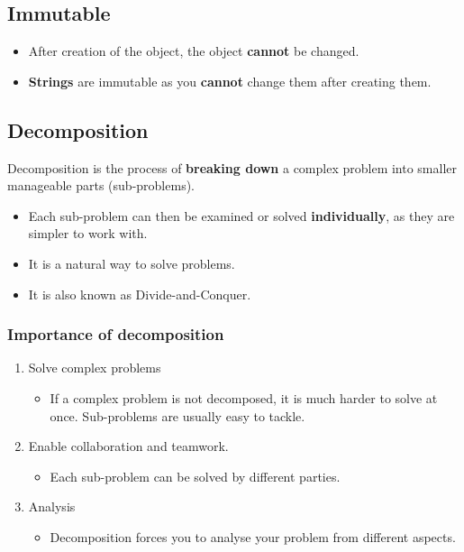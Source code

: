 \documentclass[11pt]{article}
\begin{document}
\subsection{Immutable}
\label{sec:orgfdb2670}
\begin{itemize}
\item After creation of the object, the object \textbf{cannot} be changed.
\item \textbf{Strings} are immutable as you \textbf{cannot} change them after creating them.
\end{itemize}

\subsection{Decomposition}
\label{sec:orgf41490e}
Decomposition is the process of \textbf{breaking down} a complex problem into smaller manageable parts (sub-problems).
\begin{itemize}
\item Each sub-problem can then be examined or solved \textbf{individually}, as they are simpler to work with.
\item It is a natural way to solve problems.
\item It is also known as Divide-and-Conquer.
\end{itemize}

\subsubsection{Importance of decomposition}
\label{sec:org63fab17}
\begin{enumerate}
\item Solve complex problems
\begin{itemize}
\item If a complex problem is not decomposed, it is much harder to solve at once. Sub-problems are usually easy to tackle.
\end{itemize}

\item Enable collaboration and teamwork.
\begin{itemize}
\item Each sub-problem can be solved by different parties.
\end{itemize}

\item Analysis
\begin{itemize}
\item Decomposition forces you to analyse your problem from different aspects.
\end{itemize}
\end{enumerate}
\end{document}
